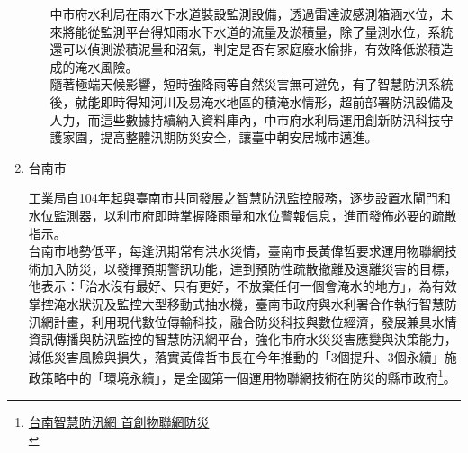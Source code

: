 \documentclass[a4paper,12pt]{article}
\begin{document}
\begin{enumerate}
\begin{enumerate}
中市府水利局在雨水下水道裝設監測設備，透過雷達波感測箱涵水位，未來將能從監測平台得知雨水下水道的流量及淤積量，除了量測水位，系統還可以偵測淤積泥量和沼氣，判定是否有家庭廢水偷排，有效降低淤積造成的淹水風險。\\

隨著極端天候影響，短時強降雨等自然災害無可避免，有了智慧防汛系統後，就能即時得知河川及易淹水地區的積淹水情形，超前部署防汛設備及人力，而這些數據持續納入資料庫內，中市府水利局運用創新防汛科技守護家園，提高整體汛期防災安全，讓臺中朝安居城市邁進。\\
\end{enumerate}

\item 台南市
\label{sec:orgaeb1e3c}

工業局自104年起與臺南市共同發展之智慧防汛監控服務，逐步設置水閘門和水位監測器，以利市府即時掌握降雨量和水位警報信息，進而發佈必要的疏散指示。\\

台南市地勢低平，每逢汛期常有洪水災情，臺南市長黃偉哲要求運用物聯網技術加入防災，以發揮預期警訊功能，達到預防性疏散撤離及遠離災害的目標，他表示：「治水沒有最好、只有更好，不放棄任何一個會淹水的地方」，為有效掌控淹水狀況及監控大型移動式抽水機，臺南市政府與水利署合作執行智慧防汛網計畫，利用現代數位傳輸科技，融合防災科技與數位經濟，發展兼具水情資訊傳播與防汛監控的智慧防汛網平台，強化市府水災災害應變與決策能力，減低災害風險與損失，落實黃偉哲市長在今年推動的「3個提升、3個永續」施政策略中的「環境永續」，是全國第一個運用物聯網技術在防災的縣市政府\footnote{\href{https://money.udn.com/money/story/5722/4508978}{台南智慧防汛網 首創物聯網防災}\\\label{orgda39184}}。\\


\end{enumerate}
\end{document}
